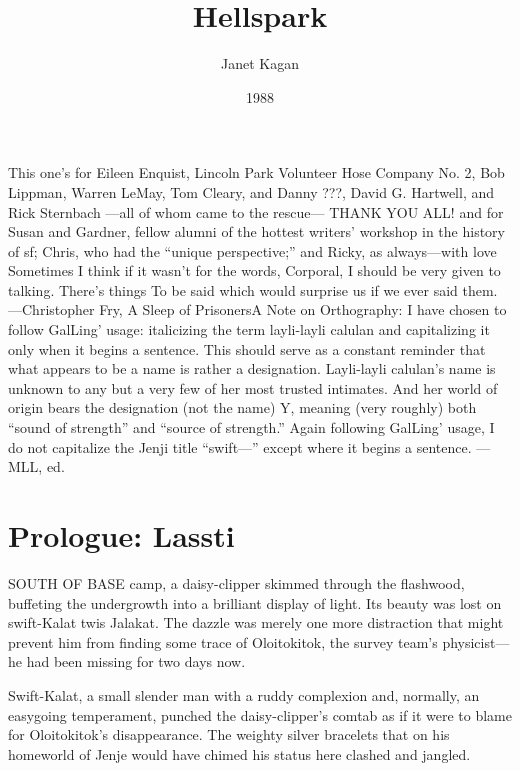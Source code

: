\documentclass[9pt]{article}
\title{Hellspark}
\author{Janet Kagan}
\date{1988}
\begin{document}
	
	\maketitle
	

This one’s for
Eileen Enquist,
Lincoln Park Volunteer Hose Company No. 2,
Bob Lippman, Warren LeMay, Tom Cleary, and
Danny ???,
David G. Hartwell, and Rick Sternbach
—all of whom came to the rescue—
THANK YOU ALL! and for
Susan and Gardner, fellow alumni of the hottest writers’ workshop in the history of sf;
Chris, who had the “unique perspective;”
and Ricky, as always—with love
Sometimes I think if it wasn’t for the words, Corporal,
I should be very given to talking. There’s things
To be said which would surprise us if we ever said them.
—Christopher Fry, A Sleep of PrisonersA Note on Orthography:
I have chosen to follow GalLing’ usage: italicizing the term layli-layli calulan and capitalizing it only
when it begins a sentence. This should serve as a constant reminder that what appears to be a name is
rather a designation. Layli-layli calulan’s name is unknown to any but a very few of her most trusted
intimates. And her world of origin bears the designation (not the name) Y, meaning (very roughly) both
“sound of strength” and “source of strength.”
Again following GalLing’ usage, I do not capitalize the Jenji title “swift—” except where it begins a
sentence.
—MLL, ed.

\section{Prologue: Lassti}
SOUTH OF BASE camp, a daisy-clipper skimmed through the flashwood, buffeting the
undergrowth into a brilliant display of light. Its beauty was lost on swift-Kalat twis Jalakat. The dazzle
was merely one more distraction that might prevent him from finding some trace of Oloitokitok, the
survey team’s physicist—he had been missing for two days now.

Swift-Kalat, a small slender man with a ruddy complexion and, normally, an easygoing temperament,
punched the daisy-clipper’s comtab as if it were to blame for Oloitokitok’s disappearance. The weighty
silver bracelets that on his homeworld of Jenje would have chimed his status here clashed and jangled.
\end{document}
